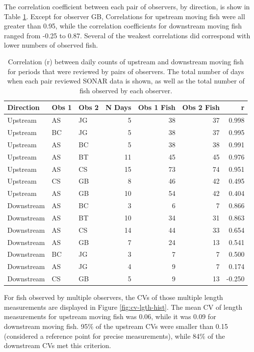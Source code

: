 \documentclass[
]{article}
\begin{document}
The correlation coefficient between each pair of observers, by direction, is show in Table \ref{tab:obs-corr}. Except for observer GB, Correlations for upstream moving fish were all greater than 0.95, while the correlation coefficients for downstream moving fish ranged from -0.25 to 0.87. Several of the weakest correlations did correspond with lower numbers of observed fish.

\begin{table}[!h]

\caption{\label{tab:obs-corr}Correlation (r) between daily counts of upstream and downstream moving fish for periods that were reviewed by pairs of observers. The total number of days when each pair reviewed SONAR data is shown, as well as the total number of fish observed by each observer.}
\centering
\begin{tabular}[t]{lllrrrr}
\toprule
Direction & Obs 1 & Obs 2 & N Days & Obs 1 Fish & Obs 2 Fish & r\\
\midrule
Upstream & AS & JG & 5 & 38 & 37 & 0.998\\
Upstream & BC & JG & 5 & 38 & 37 & 0.995\\
Upstream & AS & BC & 5 & 38 & 38 & 0.991\\
Upstream & AS & BT & 11 & 45 & 45 & 0.976\\
Upstream & AS & CS & 15 & 73 & 74 & 0.951\\
Upstream & CS & GB & 8 & 46 & 42 & 0.495\\
Upstream & AS & GB & 10 & 54 & 42 & 0.404\\
\midrule
Downstream & AS & BC & 3 & 6 & 7 & 0.866\\
Downstream & AS & BT & 10 & 34 & 31 & 0.863\\
Downstream & AS & CS & 14 & 44 & 33 & 0.654\\
Downstream & AS & GB & 7 & 24 & 13 & 0.541\\
Downstream & BC & JG & 3 & 7 & 7 & 0.500\\
Downstream & AS & JG & 4 & 9 & 7 & 0.174\\
Downstream & CS & GB & 5 & 9 & 13 & -0.250\\
\bottomrule
\end{tabular}
\end{table}

For fish observed by multiple observers, the CVs of those multiple length measurements are displayed in Figure \ref{fig:cv-lgth-hist}. The mean CV of length measurements for upstream moving fish was 0.06, while it was 0.09 for downstream moving fish. 95\% of the upstream CVs were smaller than 0.15 (considered a reference point for precise measurements), while 84\% of the downstream CVs met this criterion.
\end{document}
